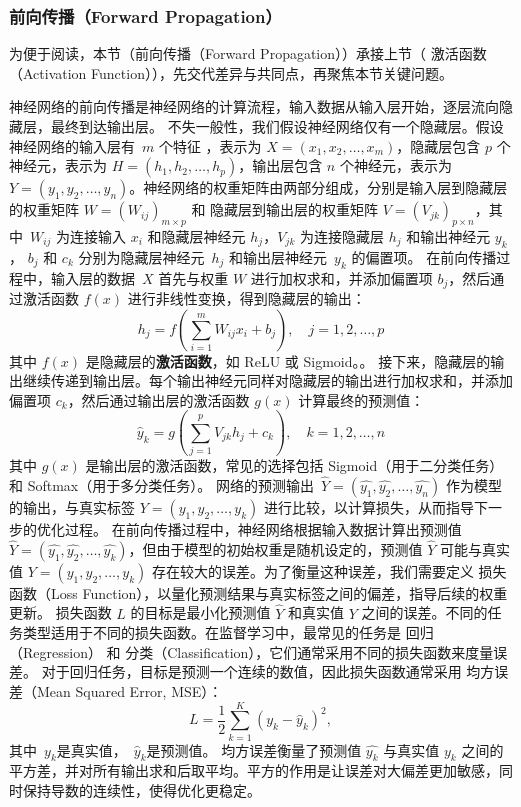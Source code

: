 \subsubsection*{前向传播（Forward Propagation）}
为便于阅读，本节（前向传播（Forward Propagation））承接上节（ 激活函数（Activation Function）），先交代差异与共同点，再聚焦本节关键问题。

神经网络的前向传播是神经网络的计算流程，输入数据从输入层开始，逐层流向隐藏层，最终到达输出层。
不失一般性，我们假设神经网络仅有一个隐藏层。假设神经网络的输入层有~$m$ 个特征 ，表示为 $X = (x_1, x_2, \dots, x_m)$，隐藏层包含 $p$ 个神经元，表示为 $H = (h_1, h_2, \dots, h_p)$，输出层包含 $n$ 个神经元，表示为 $Y = (y_1, y_2, \dots, y_n)$。神经网络的权重矩阵由两部分组成，分别是输入层到隐藏层的权重矩阵 $W = (W_{ij})_{m\times p}$  和 隐藏层到输出层的权重矩阵 $V = (V_{jk})_{p\times n}$，其中~$ W_{ij} $ 为连接输入 $ x_i $ 和隐藏层神经元 $ h_j $，$ V_{jk} $ 为连接隐藏层 $ h_j $ 和输出神经元 $ y_k $， $b_j$ 和 $c_k$ 分别为隐藏层神经元~$h_j$ 和输出层神经元~$y_k$ 的偏置项。
在前向传播过程中，输入层的数据~$X$ 首先与权重 $W$ 进行加权求和，并添加偏置项 $b_j$，然后通过激活函数 $f(x)$ 进行非线性变换，得到隐藏层的输出：
$$ h_j = f\left( \sum_{i=1}^m W_{ij} x_i +b_j \right), \quad j=1,2,\dots, p$$
其中 $ f(x) $ 是隐藏层的{\bf 激活函数}，如 ReLU 或 Sigmoid。。
接下来，隐藏层的输出继续传递到输出层。每个输出神经元同样对隐藏层的输出进行加权求和，并添加偏置项 $c_k$，然后通过输出层的激活函数 $g(x)$ 计算最终的预测值：
$$ \hat y_k = g\left( \sum_{j=1}^p V_{jk} h_j +c_k \right), \quad k=1,2,\dots, n$$
其中 $ g(x) $ 是输出层的激活函数，常见的选择包括 Sigmoid（用于二分类任务）和 Softmax（用于多分类任务）。
网络的预测输出~$\hat Y= ( \hat{y_1},\hat{y_2},\dots,\hat{y_n} )$ 作为模型的输出，与真实标签 $Y = (y_1, y_2, \dots, y_k)$ 进行比较，以计算损失，从而指导下一步的优化过程。
在前向传播过程中，神经网络根据输入数据计算出预测值 $\hat{Y} = (\hat{y_1}, \hat{y_2}, \dots, \hat{y_k})$，但由于模型的初始权重是随机设定的，预测值 $\hat{Y}$ 可能与真实值 $Y = (y_1, y_2, \dots, y_k)$ 存在较大的误差。为了衡量这种误差，我们需要定义 损失函数（Loss Function），以量化预测结果与真实标签之间的偏差，指导后续的权重更新。
损失函数 $L$ 的目标是最小化预测值 $\hat{Y}$ 和真实值 $Y$ 之间的误差。不同的任务类型适用于不同的损失函数。在监督学习中，最常见的任务是 回归（Regression） 和 分类（Classification），它们通常采用不同的损失函数来度量误差。
对于回归任务，目标是预测一个连续的数值，因此损失函数通常采用 均方误差（Mean Squared Error, MSE）：
$$ L = \frac{1}{2} \sum_{k=1}^K \left( y_k-\hat y_k \right)^2, $$
其中~$y_k$是真实值，~$\hat y_k$是预测值。 均方误差衡量了预测值 $\hat{y_k}$ 与真实值 $y_k$ 之间的平方差，并对所有输出求和后取平均。平方的作用是让误差对大偏差更加敏感，同时保持导数的连续性，使得优化更稳定。
